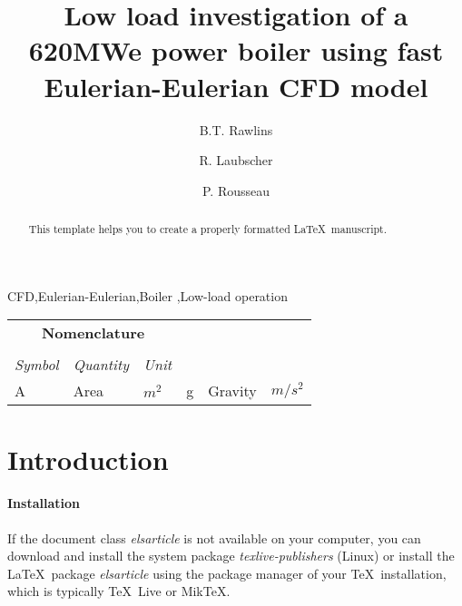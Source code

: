 \documentclass[review]{elsarticle}
\begin{document}
\begin{frontmatter}

\title{Low load investigation of a 620MWe power boiler using fast Eulerian-Eulerian CFD model}


\author{B.T. Rawlins}
\author{R. Laubscher}
\author{P. Rousseau}
\address{Department of Mechanical Engineering, Applied Thermal-Fluid Process Modeling Research Unit, University of Cape Town, Library Rd, Rondebosch, Cape Town, 7701, South Africa}


\begin{abstract}
This template helps you to create a properly formatted \LaTeX\ manuscript.
\end{abstract}

\begin{keyword}
CFD\sep Eulerian-Eulerian\sep Boiler \sep Low-load operation
\end{keyword}

\end{frontmatter}

\linenumbers

\begin{center}
\begin{tabular}{ |llllll| } 
 \hline
\multicolumn{3}{|c}{\textbf{Nomenclature}} & & &\\
& & & & & \\
\textit{Symbol} & \textit{Quantity} & \textit{Unit} & & &\\
A &  Area & $m^2$ & g & Gravity & $m/s^2$\\
 \hline
\end{tabular}
\end{center}

\section{Introduction}

\paragraph{Installation} If the document class \emph{elsarticle} is not available on your computer, you can download and install the system package \emph{texlive-publishers} (Linux) or install the \LaTeX\ package \emph{elsarticle} using the package manager of your \TeX\ installation, which is typically \TeX\ Live or Mik\TeX.
\end{document}
